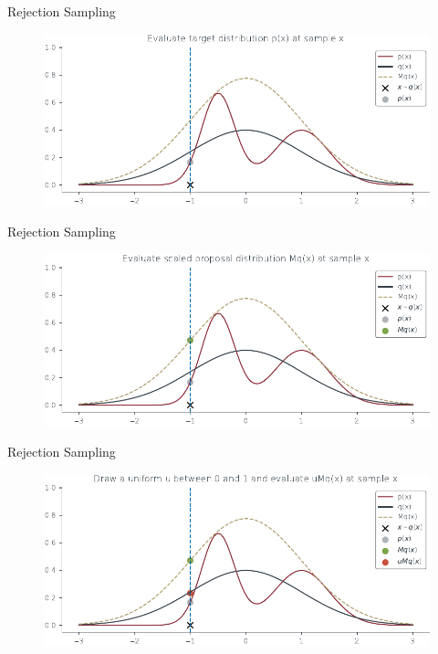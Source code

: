 \documentclass{beamer}
\begin{document}
    \begin{frame}{Rejection Sampling}
        \begin{figure}
            \centering
            \includegraphics[scale = 0.75]{../figures/sampling/rejection-sampling--1.0-True-True-True-True-True-False-False-False.pdf}
        \end{figure}
    \end{frame}

    \begin{frame}{Rejection Sampling}
        \begin{figure}
            \centering
            \includegraphics[scale = 0.75]{../figures/sampling/rejection-sampling--1.0-True-True-True-True-True-True-False-False.pdf}
        \end{figure}
    \end{frame}

    \begin{frame}{Rejection Sampling}
        \begin{figure}
            \centering
            \includegraphics[scale = 0.75]{../figures/sampling/rejection-sampling--1.0-True-True-True-True-True-True-True-False.pdf}
        \end{figure}
    \end{frame}
\end{document}
